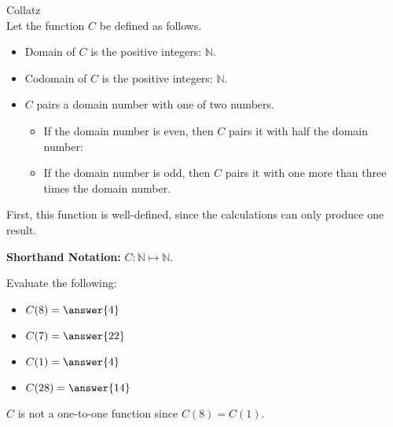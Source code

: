 \documentclass{ximera}
\begin{document}
\begin{example} Collatz \\

Let the function $C$ be defined as follows.


\begin{itemize}
\item Domain of $C$ is the positive integers: $\mathbb{N}$.
\item Codomain of $C$ is the positive integers: $\mathbb{N}$.
\item $C$ pairs a domain number with one of two numbers.
	\begin{itemize}
			\item If the domain number is even, then $C$ pairs it with half the domain number:
			\item If the domain number is odd, then $C$ pairs it with one more than three times the domain number.
	\end{itemize}
\end{itemize}


First, this function is well-defined, since the calculations can only produce one result.


\textbf{Shorthand Notation: } $C: \mathbb{N} \mapsto \mathbb{N}$.

\begin{question}
Evaluate the following:

\begin{itemize}
	\item $C(8) = \answer{4}$
	\item $C(7) = \answer{22}$
	\item $C(1) = \answer{4}$
	\item $C(28) = \answer{14}$
\end{itemize}

\end{question}



$C$ is not a one-to-one function since $C(8) = C(1)$.


\end{example}
\end{document}
